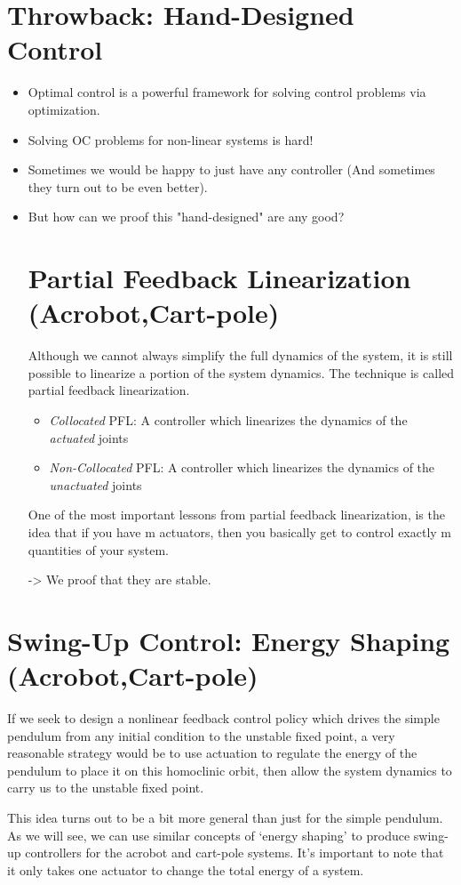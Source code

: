 \section{Throwback: Hand-Designed Control}
\begin{itemize}
\item Optimal control is a powerful framework for solving control problems via optimization.
\item Solving OC problems for non-linear systems is hard!
\item Sometimes we would be happy to just have any controller (And sometimes they turn out to be even better).
\item But how can we proof this "hand-designed" are any good? 
\section{Partial Feedback Linearization (Acrobot,Cart-pole)}
Although we cannot always simplify the full dynamics of the system, it is still possible to linearize a portion of the system dynamics. The technique is called partial feedback linearization.
\begin{itemize}
\item \textit{Collocated} PFL: A controller which linearizes the dynamics of the \textit{actuated} joints
\item \textit{Non-Collocated} PFL: A controller which linearizes the dynamics of the \textit{unactuated} joints
\end{itemize}
One of the most important lessons from partial feedback linearization, is the idea that if you have m actuators, then you basically get to control exactly m quantities of your system.

-> We proof that they are stable. 
\end{itemize}

\section{Swing-Up Control: Energy Shaping (Acrobot,Cart-pole)}
If we seek to design a nonlinear feedback control policy which drives the simple pendulum from any initial condition to the unstable fixed point, a very reasonable strategy would be to use actuation to regulate the energy of the pendulum to place it on this homoclinic orbit, then allow the system dynamics to carry us to the unstable fixed point.

This idea turns out to be a bit more general than just for the simple pendulum. As we will see, we can use similar concepts of `energy shaping' to produce swing-up controllers for the acrobot and cart-pole systems. It's important to note that it only takes one actuator to change the total energy of a system.

